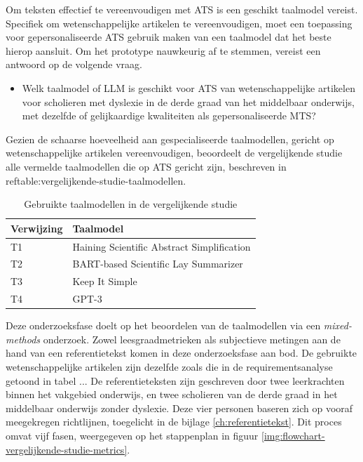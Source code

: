 Om teksten effectief te vereenvoudigen met ATS is een geschikt taalmodel vereist. Specifiek om wetenschappelijke artikelen te vereenvoudigen, moet een toepassing voor gepersonaliseerde ATS gebruik maken van een taalmodel dat het beste hierop aansluit. Om het prototype nauwkeurig af te stemmen, vereist een antwoord op de volgende vraag.

\begin{itemize}
	\item Welk taalmodel of LLM is geschikt voor ATS van wetenschappelijke artikelen voor scholieren met dyslexie in de derde graad van het middelbaar onderwijs, met dezelfde of gelijkaardige kwaliteiten als gepersonaliseerde MTS?
\end{itemize}

Gezien de schaarse hoeveelheid aan gespecialiseerde taalmodellen, gericht op wetenschappelijke artikelen vereenvoudigen, beoordeelt de vergelijkende studie alle vermelde taalmodellen die op ATS gericht zijn, beschreven in ref{table:vergelijkende-studie-taalmodellen}.

\begin{center}
	\begin{table}[H]
		\begin{tabular}{ | m{4cm} | m{12cm} | } 
			\hline
			\textbf{Verwijzing} & \textbf{Taalmodel} \\
			\hline
			T1 & Haining Scientific Abstract Simplification \\
			\hline
			T2 & BART-based Scientific Lay Summarizer \\
			\hline
			T3 & Keep It Simple\\
			\hline
			T4 & GPT-3 \\
			\hline
		\end{tabular}
		\caption{Gebruikte taalmodellen in de vergelijkende studie}
		\label{table:vergelijkende-studie-taalmodellen}
	\end{table}
\end{center}

\medspace

Deze onderzoeksfase doelt op het beoordelen van de taalmodellen via een \textit{mixed-methods} onderzoek. Zowel leesgraadmetrieken als subjectieve metingen aan de hand van een referentietekst komen in deze onderzoeksfase aan bod. De gebruikte wetenschappelijke artikelen zijn dezelfde zoals die in de requirementsanalyse getoond in tabel ...  De referentieteksten zijn geschreven door twee leerkrachten binnen het vakgebied onderwijs, en twee scholieren van de derde graad in het middelbaar onderwijs zonder dyslexie. Deze vier personen baseren zich op vooraf meegekregen richtlijnen, toegelicht in de bijlage \ref{ch:referentietekst}.  Dit proces omvat vijf fasen, weergegeven op het stappenplan in figuur \ref{img:flowchart-vergelijkende-studie-metrics}.

